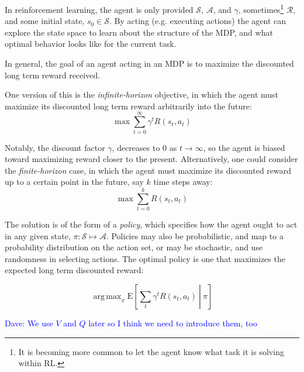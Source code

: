 \documentclass[11pt]{article}
\newcommand\davenote[1]{\textcolor{blue}{Dave: #1}}
\DeclareMathOperator*{\argmax}{arg\,max}
\begin{document}
In reinforcement learning, the agent is only provided $\mathcal{S}$, $\mathcal{A}$, and $\gamma$, sometimes\footnote{It is becoming more common to let the agent know what task it is solving within RL.} $\mathcal{R}$, and some initial state, $s_0 \in \mathcal{S}$. By acting (e.g. executing actions) the agent can explore the state space to learn about the structure of the MDP, and what optimal behavior looks like for the current task.

In general, the goal of an agent acting in an MDP is to maximize the discounted long term reward received. 

One version of this is the {\it infinite-horizon} objective, in which the agent must maximize its discounted long term reward arbitrarily into the future:
\begin{equation}
\max \sum_{t=0}^{\infty} \gamma^t R(s_t,a_t)
\end{equation}

Notably, the discount factor $\gamma$, decreases to $0$ as $t \rightarrow \infty$, so the agent is biased toward maximizing reward closer to the present. Alternatively, one could consider the {\it finite-horizon} case, in which the agent must maximize its discounted reward up to a certain point in the future, say $k$ time steps away:
\begin{equation}
\max \sum_{t=0}^{k} R(s_t,a_t)
\end{equation}

The solution is of the form of a {\it policy}, which specifies how the agent ought to act in any given state, $\pi : \mathcal{S} \mapsto \mathcal{A}$. Policies may also be probabilistic, and map to a probability distribution on the action set, or may be stochastic, and use randomness in selecting actions. The optimal policy is one that maximizes the expected long term discounted reward:

\begin{equation}
\argmax_\pi \left.\text{E}\left[\sum_t \gamma^t R(s_t,a_t)\ \right|\ \pi\right]
\end{equation}

\davenote{We use $V$ and $Q$ later so I think we need to introduce them, too}

\end{document}
